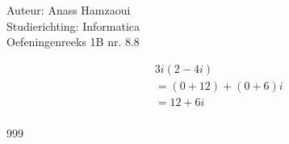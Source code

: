 \documentclass[a4paper]{article}
\begin{document}
  
\noindent \large Auteur: Anass Hamzaoui \\
\noindent \large Studierichting: Informatica\\
\noindent \large Oefeningenreeks 1B nr. 8.8\\

\medskip

\normalsize

\begin{eqnarray*}
	&& 3i(2 - 4i) \\
	&& = (0 + 12) + (0 + 6)i \\
	&& = 12 + 6i \\
\end{eqnarray*}
                                             

\begin{thebibliography}{999}
\end{thebibliography}
\end{document}
